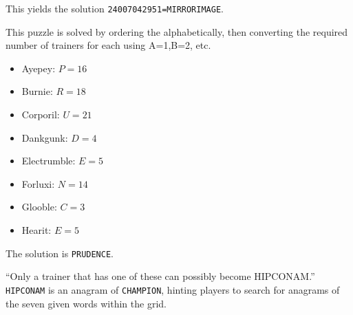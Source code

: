 This yields the solution \texttt{24007042951=MIRRORIMAGE}.


This puzzle is solved by ordering the \mappMobimon{} alphabetically,
then converting the required number of trainers for each
using A=1,B=2, etc.

\begin{multicols}{2}
\begin{itemize}
  \item {Ayepey}: \(P=16\)
  \item {Burnie}: \(R=18\)
  \item {Corporil}: \(U=21\)
  \item {Dankgunk}: \(D=4\)
  \item {Electrumble}: \(E=5\)
  \item {Forluxi}: \(N=14\)
  \item {Glooble}: \(C=3\)
  \item {Hearit}: \(E=5\)
\end{itemize}
\end{multicols}

The solution is \texttt{PRUDENCE}.


``Only a trainer that has one of these can possibly become HIPCONAM.''
\texttt{HIPCONAM} is an anagram of \texttt{CHAMPION}, hinting players to
search for anagrams of the seven given words within the grid.

